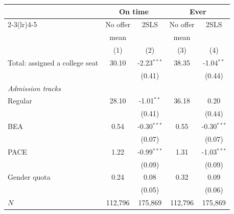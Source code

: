 \begin{tabular}{lcccc}
\toprule
 & \multicolumn{2}{c}{On time} & \multicolumn{2}{c}{Ever}\\
\cmidrule(lr){2-3}\cmidrule(lr){4-5}
 & No offer & 2SLS & No offer & 2SLS\\
 & mean &  & mean & \\
 & (1) & (2) & (3) & (4)\\
\midrule
Total: assigned a college seat & 30.10 & -2.23$^{***}$ & 38.35 & -1.04$^{**}$\\
 &  & (0.41) &  & (0.44)\\
\midrule
\multicolumn{5}{l}{\textit{Admission tracks}}\\
Regular & 28.10 & -1.01$^{**}$ & 36.18 & 0.20\\
 &  & (0.41) &  & (0.44)\\
BEA & 0.54 & -0.30$^{***}$ & 0.55 & -0.30$^{***}$\\
 &  & (0.07) &  & (0.07)\\
PACE & 1.22 & -0.99$^{***}$ & 1.31 & -1.03$^{***}$\\
 &  & (0.09) &  & (0.09)\\
Gender quota & 0.24 & 0.08 & 0.32 & 0.09\\
 &  & (0.05) &  & (0.06)\\
\midrule
$N$ & 112,796 & 175,869 & 112,796 & 175,869\\
\bottomrule
\end{tabular}
